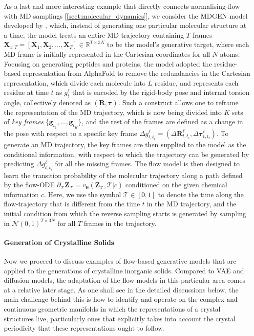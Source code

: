 As a last and more interesting example that directly connects normalising-flow with MD samplings [\cref{sect:molecular_dynamics}], we consider the \textsc{MDGEN} model developed by  \citet{jing2024generative}, which, instead of generating one particular molecular structure at a time, the model treats an entire MD trajectory containing $T$ frames $\bm{X}_{1:T}=[\bm{X}_1,\bm{X}_2,\ldots,\bm{X}_T]\in\mathbb{R}^{T\times 3N}$ to be the model's generative target, where each MD frame is initially represented in the Cartesian coordinates for all $N$ atoms. Focusing on generating peptides and proteins, the model adopted the residue-based representation from AlphaFold\cite{jumper2021highly} to remove the redundancies in the Cartesian representation, which divide each molecule into $L$ residue, and represents each residue at time $t$ as $g_t^\ell$ that is encoded by the rigid-body pose and internal torsion angle, collectively denoted as $(\bm{R},\boldsymbol{\tau})$. Such a construct allows one to reframe the representation of the MD trajectory, which is now being divided into $K$ sets of \emph{key frames} $\{\bm{g}_{t_1},\ldots,\bm{g}_{t_K}\}$, and the rest of the frames are defined as a change in the pose with respect to a specific key frame $\Delta g^\ell_{t,t_i}=(\Delta \bm{R}^\ell_{t,t_i},\Delta\boldsymbol{\tau}^\ell_{t,t_i})$. To generate an MD trajectory, the key frames are then supplied to the model as the conditional information, with respect to which the trajectory can be generated by predicting $\Delta g^\ell_{t,t_i}$ for all the missing frames. The flow model is then designed to learn the transition probability of the molecular trajectory along a path defined by the flow-ODE $\partial_\mathcal{T}\bm{Z}_{\mathcal{T}}=v_{\boldsymbol{\theta}}(\bm{Z}_{\mathcal{T}},\mathcal{T}|c)$ conditioned on the given chemical information $c$. Here, we use the symbol $\mathcal{T}\in[0,1]$ to denote the time along the flow-trajectory that is different from the time $t$ in the MD trajectory, and the initial condition from which the reverse sampling starts is generated by sampling in $\mathcal{N}(0,1)^{T\times 3N}$ for all $T$ frames in the trajectory.

\paragraph{\textbf{Generation of Crystalline Solids}} Now we proceed to discuss examples of flow-based generative models that are applied to the generations of crystalline inorganic solids. Compared to VAE and diffusion models, the adaptation of the flow models in this particular area comes at a relative later stage. As one shall see in the detailed discussions below, the main challenge behind this is how to identify and operate on the complex and continuous geometric manifolds in which the representations of a crystal structures live, particularly ones that explicitly takes into account the crystal periodicity  that these representations ought to follow.

